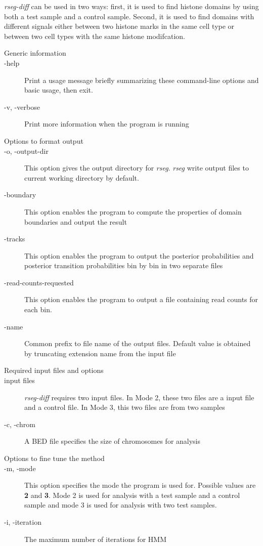 \documentclass[11pt]{report}
\begin{document}
\textit{rseg-diff} can be used in two ways: first, it is used to find
histone domains by using both a test sample and a control
sample. Second, it is used to find domains with different signals
either between two histone marks in the same cell type or between two
cell types with the same histone modifcation. 

\begin{description}
\item[Generic information]
\item[-help] Print a usage message briefly summarizing these
  command-line options and basic usage, then exit.
\item[-v, -verbose] Print more information when the program is running
\item[Options to format output]
\item[-o, -output-dir] This option gives the output directory for
  \textit{rseg}. \textit{rseg} write output files to current working
  directory by default.
\item[-boundary] This option enables the program to compute the
  properties of domain boundaries and output the result
\item[-tracks] This option enables the program to output the
  posterior probabilities and posterior transition probabilities bin
  by bin in two separate files
\item[-read-counts-requested] This option enables the program to
  output a file containing read counts for each bin.  
\item[-name] Common prefix to file name of the output
  files. Default value is obtained by truncating extension name from
the input file
\item[Required input files and options]
\item[input files] \textit{rseg-diff} requires two input files. In
  Mode 2, these two files are a input file and a control file. In Mode
  3, this two files are from two samples  
\item[-c, -chrom] A BED file specifies the size of chromosomes for
  analysis
\item[Options to fine tune the method]
\item[-m, -mode] This option specifies the mode the program is used
  for. Possible values are \textbf{2} and \textbf{3}. Mode 2 is used
  for analysis with a test sample and a control sample and mode 3 is
  used for analysis with two test samples.
\item[-i, -iteration] The maximum number of iterations for HMM

\end{description}
\end{document}
